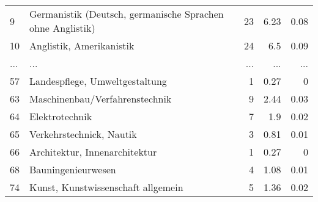 \begin{longtable}{lXrrr}
        9 & \multicolumn{1}{X}{Germanistik (Deutsch, germanische Sprachen ohne Anglistik)} & %
          \num{23} &
          \num[round-mode=places,round-precision=2]{6.23} &
          \num[round-mode=places,round-precision=2]{0.08} \\
        10 & \multicolumn{1}{X}{Anglistik, Amerikanistik} & %
          \num{24} &
          \num[round-mode=places,round-precision=2]{6.5} &
          \num[round-mode=places,round-precision=2]{0.09} \\
       ... & ... & ... & ... & ... \\
        57 & \multicolumn{1}{X}{Landespflege, Umweltgestaltung} & %
          \num{1} &
          \num[round-mode=places,round-precision=2]{0.27} &
          \num[round-mode=places,round-precision=2]{0} \\

        63 & \multicolumn{1}{X}{Maschinenbau/Verfahrenstechnik} & %
          \num{9} &
          \num[round-mode=places,round-precision=2]{2.44} &
          \num[round-mode=places,round-precision=2]{0.03} \\

        64 & \multicolumn{1}{X}{Elektrotechnik} & %
          \num{7} &
          \num[round-mode=places,round-precision=2]{1.9} &
          \num[round-mode=places,round-precision=2]{0.02} \\

        65 & \multicolumn{1}{X}{Verkehrstechnick, Nautik} & %
          \num{3} &
          \num[round-mode=places,round-precision=2]{0.81} &
          \num[round-mode=places,round-precision=2]{0.01} \\

        66 & \multicolumn{1}{X}{Architektur, Innenarchitektur} & %
          \num{1} &
          \num[round-mode=places,round-precision=2]{0.27} &
          \num[round-mode=places,round-precision=2]{0} \\

        68 & \multicolumn{1}{X}{Bauningenieurwesen} & %
          \num{4} &
          \num[round-mode=places,round-precision=2]{1.08} &
          \num[round-mode=places,round-precision=2]{0.01} \\

        74 & \multicolumn{1}{X}{Kunst, Kunstwissenschaft allgemein} & %
          \num{5} &
          \num[round-mode=places,round-precision=2]{1.36} &
          \num[round-mode=places,round-precision=2]{0.02} \\


\end{longtable}
